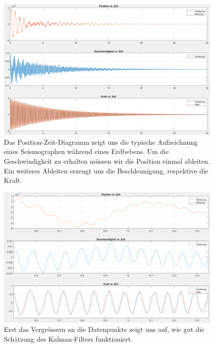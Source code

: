 \begin{figure}
	\begin{center}
		\includegraphics[width=\linewidth,keepaspectratio]{papers/erdbeben/Standard_alles.PNG}
		\caption{Das Position-Zeit-Diagramm zeigt uns die typische Aufzeichnung eines Seismographen während eines Erdbebens. Um die Geschwindigkeit zu erhalten müssen wir die Position einmal ableiten. Ein weiteres Ableiten erzeugt uns die Beschleunigung, respektive die Kraft.}
    \label{erdbeben:fig:standard-alles}
	\end{center}
\end{figure}

\begin{figure}
	\begin{center}
		\includegraphics[width=\linewidth,keepaspectratio]{papers/erdbeben/Standard_Zoom.PNG}
		\caption{Erst das Vergrössern an die Datenpunkte zeigt uns auf, wie gut die Schätzung des Kalman-Filters funktioniert.}
    \label{erdbeben:fig:standard-zoom}
	\end{center}
\end{figure}


